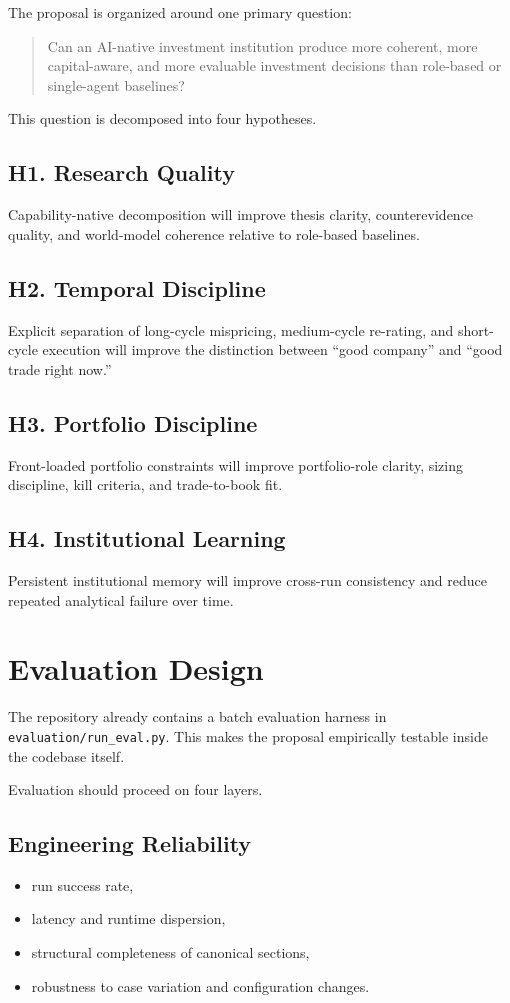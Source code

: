 \documentclass[11pt]{article}
\begin{document}
The proposal is organized around one primary question:

\begin{quote}
Can an AI-native investment institution produce more coherent, more capital-aware, and more evaluable investment decisions than role-based or single-agent baselines?
\end{quote}

This question is decomposed into four hypotheses.

\subsection*{H1. Research Quality}
Capability-native decomposition will improve thesis clarity, counterevidence quality, and world-model coherence relative to role-based baselines.

\subsection*{H2. Temporal Discipline}
Explicit separation of long-cycle mispricing, medium-cycle re-rating, and short-cycle execution will improve the distinction between ``good company'' and ``good trade right now.''

\subsection*{H3. Portfolio Discipline}
Front-loaded portfolio constraints will improve portfolio-role clarity, sizing discipline, kill criteria, and trade-to-book fit.

\subsection*{H4. Institutional Learning}
Persistent institutional memory will improve cross-run consistency and reduce repeated analytical failure over time.

\section{Evaluation Design}

The repository already contains a batch evaluation harness in \texttt{evaluation/run\_eval.py}. This makes the proposal empirically testable inside the codebase itself.

Evaluation should proceed on four layers.

\subsection{Engineering Reliability}
\begin{itemize}
\item run success rate,
\item latency and runtime dispersion,
\item structural completeness of canonical sections,
\item robustness to case variation and configuration changes.
\end{itemize}
\end{document}
